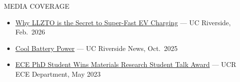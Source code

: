 \documentclass{resume} %
\begin{document}
\begin{rSection}{MEDIA COVERAGE}
\begin{itemize}
\itemsep 0.1em
\item \href{https://www.youtube.com/watch?v=dPwabntYj9s}{Why LLZTO is the Secret to Super-Fast EV Charging} --- UC Riverside, Feb.\ 2026
\item \href{https://news.ucr.edu/articles/2025/10/22/cool-battery-power}{Cool Battery Power} --- UC Riverside News, Oct.\ 2025
\item \href{https://ece.ucr.edu/news/2023/05/10/ece-phd-student-wins-materials-research-student-talk-award}{ECE PhD Student Wins Materials Research Student Talk Award} --- UCR ECE Department, May 2023
\end{itemize}
\end{rSection}


 
\end{document}

